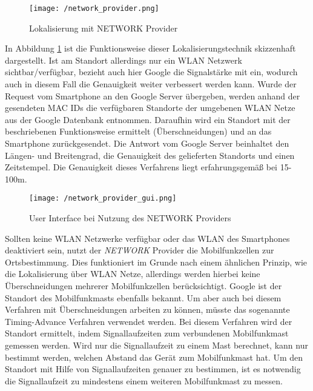 \begin{figure}[H]
	\centering
	\texttt{[image: /network\_provider.png]}
	\caption[Lokalisierung: Lokalisierung mit NETWORK Provider]{Lokalisierung mit NETWORK Provider}
	\label{fig:networkProviderfunc}
\end{figure}

In Abbildung \ref{fig:networkProviderfunc} ist die Funktionsweise dieser Lokalisierungstechnik skizzenhaft dargestellt. Ist am Standort allerdings nur ein WLAN Netzwerk sichtbar/verfügbar, bezieht auch hier Google die Signalstärke mit ein, wodurch auch in diesem Fall die Genauigkeit weiter verbessert werden kann.
Wurde der Request vom Smartphone an den Google Server übergeben, werden anhand der gesendeten MAC IDs die verfügbaren Standorte der umgebenen WLAN Netze aus der Google Datenbank entnommen. Daraufhin wird ein Standort mit der beschriebenen Funktionsweise ermittelt (Überschneidungen) und an das Smartphone zurückgesendet. Die Antwort vom Google Server beinhaltet den Längen- und Breitengrad, die Genauigkeit des gelieferten Standorts und einen Zeitstempel. Die Genauigkeit dieses Verfahrens liegt erfahrungsgemäß bei 15-100m.

\begin{figure}[H]
\centering
\texttt{[image: /network\_provider\_gui.png]}
\caption[Lokalisierung: User Interface bei Nutzung des NETWORK Providers]{User Interface bei Nutzung des NETWORK Providers}
\label{fig:networkProviderGui}
\end{figure}

Sollten keine WLAN Netzwerke verfügbar oder das WLAN des Smartphones deaktiviert sein, nutzt der \textit{NETWORK} Provider die Mobilfunkzellen zur Ortsbestimmung. Dies funktioniert im Grunde nach einem ähnlichen Prinzip, wie die Lokalisierung über WLAN Netze, allerdings werden hierbei keine Überschneidungen mehrerer Mobilfunkzellen berücksichtigt. Google ist der Standort des Mobilfunkmasts ebenfalls bekannt. Um aber auch bei diesem Verfahren mit Überschneidungen arbeiten zu können, müsste das sogenannte Timing-Advance Verfahren verwendet werden. Bei diesem Verfahren wird der Standort ermittelt, indem Signallaufzeiten zum verbundenen Mobilfunkmast gemessen werden. Wird nur die Signallaufzeit zu einem Mast berechnet, kann nur bestimmt werden, welchen Abstand das Gerät zum Mobilfunkmast hat. Um den Standort mit Hilfe von Signallaufzeiten genauer zu bestimmen, ist es notwendig die Signallaufzeit zu mindestens einem weiteren Mobilfunkmast zu messen.


